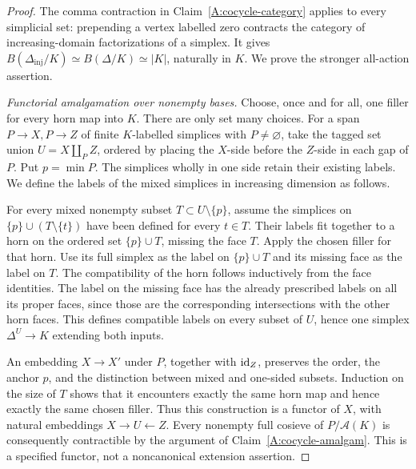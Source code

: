 \begin{proof}
The comma contraction in Claim~\ref{A:cocycle-category} applies to every simplicial set: prepending a vertex labelled zero contracts the category of increasing-domain factorizations of a simplex. It gives
$B(\Delta_{\mathrm{inj}}/K)\simeq B(\Delta/K)\simeq|K|$, naturally in $K$. We prove the stronger all-action assertion.

\emph{Functorial amalgamation over nonempty bases.}
Choose, once and for all, one filler for every horn map into $K$. There are only set many choices. For a span $P\to X,P\to Z$ of finite $K$-labelled simplices with $P\ne\varnothing$, take the tagged set union $U=X\amalg_P Z$, ordered by placing the $X$-side before the $Z$-side in each gap of $P$. Put $p=\min P$. The simplices wholly in one side retain their existing labels. We define the labels of the mixed simplices in increasing dimension as follows.

For every mixed nonempty subset $T\subset U\setminus\{p\}$, assume the simplices on $\{p\}\cup(T\setminus\{t\})$ have been defined for every $t\in T$. Their labels fit together to a horn on the ordered set $\{p\}\cup T$, missing the face $T$. Apply the chosen filler for that horn. Use its full simplex as the label on $\{p\}\cup T$ and its missing face as the label on $T$. The compatibility of the horn follows inductively from the face identities. The label on the missing face has the already prescribed labels on all its proper faces, since those are the corresponding intersections with the other horn faces. This defines compatible labels on every subset of $U$, hence one simplex $\Delta^U\to K$ extending both inputs.

An embedding $X\to X'$ under $P$, together with $\mathrm{id}_Z$, preserves the order, the anchor $p$, and the distinction between mixed and one-sided subsets. Induction on the size of $T$ shows that it encounters exactly the same horn map and hence exactly the same chosen filler. Thus this construction is a functor of $X$, with natural embeddings $X\to U\leftarrow Z$. Every nonempty full cosieve of $P/\mathcal A(K)$ is consequently contractible by the argument of Claim~\ref{A:cocycle-amalgam}. This is a specified functor, not a noncanonical extension assertion.


\end{proof}
